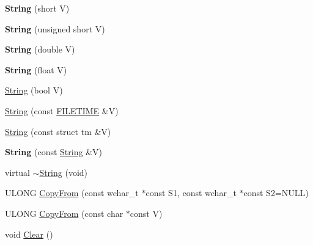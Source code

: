 \begin{DoxyCompactItemize}
{\bfseries String} (short V)
\item 
\mbox{\label{class_canberra_1_1_utility_1_1_core_1_1_string_a9eb1cf2560f9e1bd99c31ed7ae1dbfc2}} 
{\bfseries String} (unsigned short V)
\item 
\mbox{\label{class_canberra_1_1_utility_1_1_core_1_1_string_afbf4ae515f9fa612cfec2236f5f2aca2}} 
{\bfseries String} (double V)
\item 
\mbox{\label{class_canberra_1_1_utility_1_1_core_1_1_string_a1c7c1083e089d0cc0b9de9aa467dc9fd}} 
{\bfseries String} (float V)
\item 
\hyperlink{class_canberra_1_1_utility_1_1_core_1_1_string_ad37ef02aba2ab8bbd095edc31e86ca2a_ad37ef02aba2ab8bbd095edc31e86ca2a}{String} (bool V)
\item 
\hyperlink{class_canberra_1_1_utility_1_1_core_1_1_string_a19326cdd26cb37a4bc757a0887900796_a19326cdd26cb37a4bc757a0887900796}{String} (const \hyperlink{struct___f_i_l_e_t_i_m_e}{F\+I\+L\+E\+T\+I\+ME} \&V)
\item 
\hyperlink{class_canberra_1_1_utility_1_1_core_1_1_string_a97efa34d4537218e59fdb3d0010d12ef_a97efa34d4537218e59fdb3d0010d12ef}{String} (const struct tm \&V)
\item 
\mbox{\label{class_canberra_1_1_utility_1_1_core_1_1_string_a9128a206092625d48eb4db22ce817c79}} 
{\bfseries String} (const \hyperlink{class_canberra_1_1_utility_1_1_core_1_1_string}{String} \&V)
\item 
virtual \hyperlink{class_canberra_1_1_utility_1_1_core_1_1_string_a98e04233ef897666c11a08a6466879e4_a98e04233ef897666c11a08a6466879e4}{$\sim$\+String} (void)
\item 
U\+L\+O\+NG \hyperlink{class_canberra_1_1_utility_1_1_core_1_1_string_a1280c29e9ec36dd69411644e1c4fe340_a1280c29e9ec36dd69411644e1c4fe340}{Copy\+From} (const wchar\+\_\+t $\ast$const S1, const wchar\+\_\+t $\ast$const S2=N\+U\+LL)
\item 
U\+L\+O\+NG \hyperlink{class_canberra_1_1_utility_1_1_core_1_1_string_aec45868a188d5dd9f93faf3a246613bc_aec45868a188d5dd9f93faf3a246613bc}{Copy\+From} (const char $\ast$const V)
\item 
void \hyperlink{class_canberra_1_1_utility_1_1_core_1_1_string_ab79c11c8c6e085fbdf15ce5531b724fe_ab79c11c8c6e085fbdf15ce5531b724fe}{Clear} ()

\end{DoxyCompactItemize}
